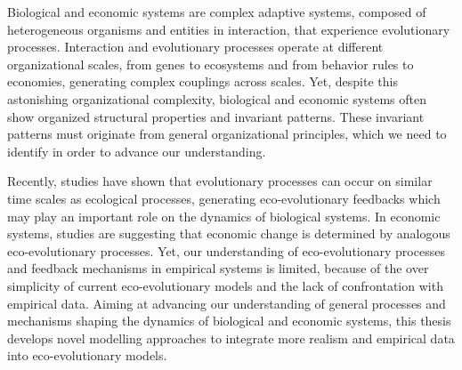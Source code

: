 %
\label{sec:summary}
\small{
Biological and economic systems are complex adaptive systems, composed of heterogeneous organisms and entities in interaction, that experience evolutionary processes.
% 
Interaction and evolutionary processes operate at different organizational scales, from genes to ecosystems and from behavior rules to economies, generating complex couplings across scales. Yet, despite this astonishing organizational complexity, biological and economic systems often show organized structural properties and invariant patterns. 
% 
%
These invariant patterns must originate from general organizational principles, which we need to identify in order to advance our understanding.

Recently, studies have shown that evolutionary processes can occur on similar time scales as ecological processes, generating eco-evolutionary feedbacks which may play an important role on the dynamics of biological systems. %
% 
In economic systems, studies are suggesting that economic change is determined by analogous eco-evolutionary processes. 
Yet, our understanding of eco-evolutionary processes and feedback mechanisms in empirical systems is limited, because of the over simplicity of current eco-evolutionary models and the lack of confrontation with empirical data. %
% 
% 
% 
Aiming at advancing our understanding of general processes and mechanisms shaping the dynamics of biological and economic systems, this thesis develops novel modelling approaches to integrate more realism and empirical data into eco-evolutionary models.

}
